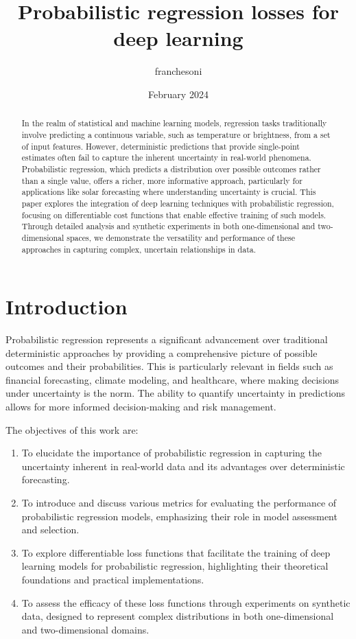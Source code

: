 \documentclass{article}
\title{Probabilistic regression losses for deep learning}
\author{franchesoni}
\date{February 2024}
\begin{document}
\maketitle

\begin{abstract}
In the realm of statistical and machine learning models, regression tasks traditionally involve predicting a continuous variable, such as temperature or brightness, from a set of input features. However, deterministic predictions that provide single-point estimates often fail to capture the inherent uncertainty in real-world phenomena. Probabilistic regression, which predicts a distribution over possible outcomes rather than a single value, offers a richer, more informative approach, particularly for applications like solar forecasting where understanding uncertainty is crucial. This paper explores the integration of deep learning techniques with probabilistic regression, focusing on differentiable cost functions that enable effective training of such models. Through detailed analysis and synthetic experiments in both one-dimensional and two-dimensional spaces, we demonstrate the versatility and performance of these approaches in capturing complex, uncertain relationships in data.
\end{abstract}


\section{Introduction}
Probabilistic regression represents a significant advancement over traditional deterministic approaches by providing a comprehensive picture of possible outcomes and their probabilities. This is particularly relevant in fields such as financial forecasting, climate modeling, and healthcare, where making decisions under uncertainty is the norm. The ability to quantify uncertainty in predictions allows for more informed decision-making and risk management.

The objectives of this work are:
\begin{enumerate}
    \item To elucidate the importance of probabilistic regression in capturing the uncertainty inherent in real-world data and its advantages over deterministic forecasting.
    \item To introduce and discuss various metrics for evaluating the performance of probabilistic regression models, emphasizing their role in model assessment and selection.
    \item To explore differentiable loss functions that facilitate the training of deep learning models for probabilistic regression, highlighting their theoretical foundations and practical implementations.
    \item To assess the efficacy of these loss functions through experiments on synthetic data, designed to represent complex distributions in both one-dimensional and two-dimensional domains.
\end{enumerate}
\end{document}
